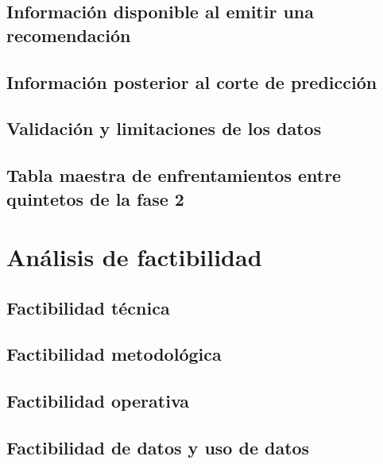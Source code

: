 \documentclass[12pt,letterpaper]{report}
\begin{document}
\subsection{Información disponible al emitir una recomendación}
\label{subsec:informacion-previa}

\subsection{Información posterior al corte de predicción}
\label{subsec:informacion-posterior}

\subsection{Validación y limitaciones de los datos}


\subsection{Tabla maestra de enfrentamientos entre quintetos de la fase 2}
\label{subsec:tabla-maestra-fase2}


\section{Análisis de factibilidad}
\subsection{Factibilidad técnica}

\subsection{Factibilidad metodológica}

\subsection{Factibilidad operativa}
\label{subsec:factibilidad-operativa}

\subsection{Factibilidad de datos y uso de datos}

\end{document}
